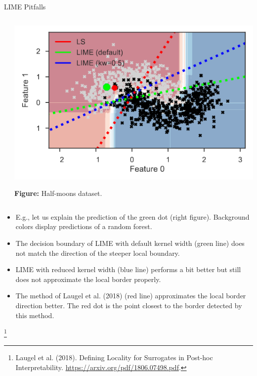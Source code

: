 \documentclass[11pt,compress,t,notes=noshow, xcolor=table]{beamer}
\begin{document}
\begin{vbframe}{LIME Pitfalls}
\begin{columns}
\begin{column}{0.68\textwidth}
\begin{center}
	\end{center}
 	\end{column}
	\begin{column}{0.3\textwidth}
			\vspace{-0.7cm}
		\begin{center}
			\includegraphics[width=1\textwidth]{figure/lime-globallocal}
			
			\vspace{-0.3cm}
			{\tiny \textbf{Figure:} Half-moons dataset.}
			
		\end{center}
	\end{column}
\end{columns}
\vspace{0.3cm}
	\begin{itemize}
		\item E.g., let us explain the prediction of the green dot (right figure). Background colors display predictions of a random forest. 
		\item The decision boundary of LIME with default kernel width (green line) does not match the direction of the steeper local boundary. 
		\item LIME with reduced kernel width (blue line) performs a bit better but still does not approximate the local border properly. 
		\item The method of Laugel et al. (2018) (red line) approximates the local border direction better. The red dot is the point closest to the border detected by this method. 
	\end{itemize}

\footnote[frame]{Laugel et al. (2018). Defining Locality for Surrogates in Post-hoc Interpretability. \url{https://arxiv.org/pdf/1806.07498.pdf}.}
\end{vbframe}
\end{document}

